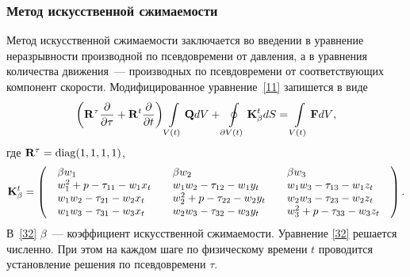 \subsubsection{Метод искусственной сжимаемости}
\label{s:1251}
Метод искусственной сжимаемости заключается во введении в уравнение неразрывности производной по 
псевдовремени от давления, а в уравнения количества движения~--- производных по псевдовремени
от соответствующих компонент скорости. Модифицированное уравнение~\eqref{11} запишется в виде
\begin{equation}
  \label{32} 
  \left( {{\bf{R}}^\tau  \frac{\partial }{{\partial \tau }} + {\bf{R}}^t \frac{\partial }{{\partial t}}}
  \right)\int\limits_{V(t)} {{\bf{Q}}dV} + \displaystyle\oint\limits_{\partial V(t)} {{\bf{K}}^t_{\beta} dS}= \int\limits_{V(t)} {{\bf{F}}dV},
\end{equation}
где ${\bf{R}}^\tau = {\rm{diag}}(1,1,1,1)$,
\begin{equation}
  \label{33}
  {\bf{K}}^t_{\beta}  = \left( {\begin{array}{*{20}c}
  \begin{array}{l}
  \beta w_1  \\
  w_1^2  + p - \tau _{11}  - w_1 x_t  \\
  w_1 w_2  - \tau _{21}  - w_2 x_t  \\
  w_1 w_3  - \tau _{31}  - w_3 x_t  \\
  \end{array} & \begin{array}{l}
  \beta w_2  \\
  w_1 w_2  - \tau _{12}  - w_1 y_t  \\
  w_2^2  + p - \tau _{22}  - w_2 y_t  \\
  w_2 w_3  - \tau _{32}  - w_3 y_t  \\
  \end{array} & \begin{array}{l}
  \beta w_3  \\
  w_1 w_3  - \tau _{13}  - w_1 z_t  \\
  w_2 w_3  - \tau _{23}  - w_2 z_t  \\
  w_3^2  + p - \tau _{33}  - w_3 z_t  \\
  \end{array}  \\
  \end{array}} \right).
\end{equation}
В~\eqref{32} $\beta$~--- коэффициент искусственной сжимаемости. Уравнение \eqref{32} решается численно. При 
этом на каждом шаге по физическому времени $t$ проводится установление решения по псевдовремени $\tau$.

